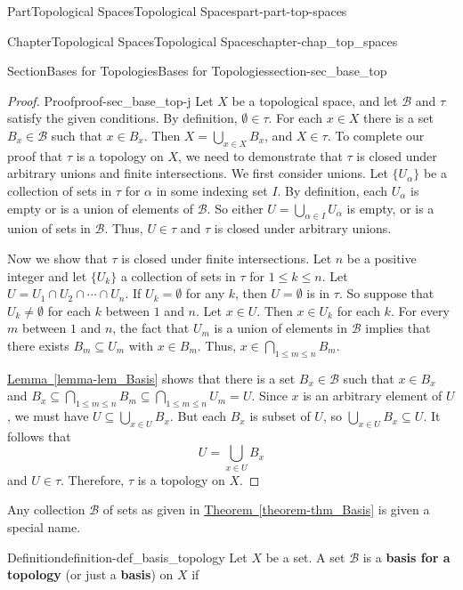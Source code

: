 \documentclass[oneside,10pt,]{book}
\newcommand{\xreffont}{\relax}
\newcommand{\terminology}[1]{\textbf{#1}}
\numberwithin{equation}{chapter}
\newcommand{\B}{\mathcal{B}}
\begin{document}
\begin{partptx}{Part}{Topological Spaces}{}{Topological Spaces}{}{}{part-part-top-spaces}
\begin{chapterptx}{Chapter}{Topological Spaces}{}{Topological Spaces}{}{}{chapter-chap_top_spaces}
\begin{sectionptx}{Section}{Bases for Topologies}{}{Bases for Topologies}{}{}{section-sec_base_top}
\begin{proof}{Proof}{}{proof-sec_base_top-j}
Let \(X\) be a topological space, and let \(\B\) and \(\tau\) satisfy the given conditions. By definition, \(\emptyset \in \tau\). For each \(x \in X\) there is a set \(B_x \in \B\) such that \(x \in B_x\). Then \(X = \bigcup_{x \in X} B_x\), and \(X \in \tau\). To complete our proof that \(\tau\) is a topology on \(X\), we need to demonstrate that \(\tau\) is closed under arbitrary unions and finite intersections. We first consider unions. Let \(\{U_{\alpha}\}\) be a collection of sets in \(\tau\) for \(\alpha\) in some indexing set \(I\). By definition, each \(U_{\alpha}\) is empty or is a union of elements of \(\B\). So either \(U = \bigcup_{\alpha \in I} U_{\alpha}\) is empty, or is a union of sets in \(\B\). Thus, \(U \in \tau\) and \(\tau\) is closed under arbitrary unions.%
\par
Now we show that \(\tau\) is closed under finite intersections. Let \(n\) be a positive integer and let \(\{U_{k}\}\) a collection of sets in \(\tau\) for \(1 \leq k \leq n\). Let \(U = U_1 \cap U_2 \cap \cdots \cap U_n\). If \(U_k = \emptyset\) for any \(k\), then \(U = \emptyset\) is in \(\tau\). So suppose that \(U_k \neq \emptyset\) for each \(k\) between \(1\) and \(n\). Let \(x \in U\). Then \(x \in U_k\) for each \(k\). For every \(m\) between \(1\) and \(n\), the fact that \(U_m\) is a union of elements in \(\B\) implies that there exists \(B_m \subseteq U_m\) with \(x \in B_m\). Thus, \(x \in \bigcap_{1 \leq m \leq n} B_m\).%
\par
\hyperref[lemma-lem_Basis]{Lemma~{\xreffont\ref{lemma-lem_Basis}}} shows that there is a set \(B_x \in \B\) such that \(x \in B_x\) and \(B_x \subseteq \bigcap_{1 \leq m \leq n} B_m \subseteq \bigcap_{1 \leq m \leq n} U_m = U\). Since \(x\) is an arbitrary element of \(U\), we must have \(U \subseteq \bigcup_{x \in U} B_x\). But each \(B_x\) is subset of \(U\), so \(\bigcup_{x \in U} B_x \subseteq U\). It follows that%
\begin{equation*}
U = \bigcup_{x \in U} B_x
\end{equation*}
and \(U \in \tau\). Therefore, \(\tau\) is a topology on \(X\).%
\end{proof}
Any collection \(\B\) of sets as given in \hyperref[theorem-thm_Basis]{Theorem~{\xreffont\ref{theorem-thm_Basis}}} is given a special name.%
\begin{definition}{Definition}{}{definition-def_basis_topology}%
%
Let \(X\) be a set. A set \(\B\) is a \terminology{basis for a topology} (or just a \terminology{basis}) on \(X\) if%
\begin{enumerate}

\end{enumerate}
\end{definition}
\end{sectionptx}
\end{chapterptx}
\end{partptx}
\end{document}
